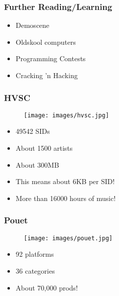 \documentclass[aspectratio=43]{uva-inf-presentation}
\begin{document}

\begin{frame}
\frametitle{Further Reading/Learning}

\begin{itemize}
\item Demoscene
\item Oldskool computers
\item Programming Contests
\item Cracking 'n Hacking
\end{itemize}

\end{frame}


\begin{frame}
\frametitle{HVSC}

\begin{figure}
\texttt{[image: images/hvsc.jpg]}
\end{figure}

\begin{itemize}
\item 49542 SIDs
\item About 1500 artists
\item About 300MB
\item This means about 6KB per SID!
\item More than 16000 hours of music!
\end{itemize}

\end{frame}


\begin{frame}
\frametitle{Pouet}

\begin{figure}
\texttt{[image: images/pouet.jpg]}
\end{figure}

\begin{itemize}
\item 92 platforms
\item 36 categories
\item About 70,000 prods!
\end{itemize}

\end{frame}

\end{document}
